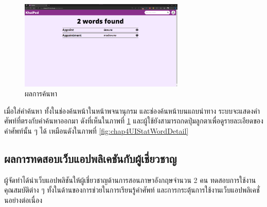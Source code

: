 \documentclass[12pt,oneside,openright,a4paper]{cpe-thai-project}
\begin{document}
\begin{figure}[!h]\centering
	\includegraphics[width=0.7\textwidth, keepaspectratio=true]{image/chap4/UI/dict/result.png}
	\caption{{ผลการค้นหา}}\label{fig:chap4UIDictResult}
\end{figure}
\hspace{1cm}
เมื่อใส่คำค้นหา ทั้งในช่องค้นหน้าในหน้าพจนานุกรม และช่องค้นหน้าบนแถบนำทาง ระบบจะแสดงคำศัพท์ที่ตรงกับคำค้นหาออกมา
ดังที่เห็นในภาพที่ \ref{fig:chap4UIDictResult} และผู้ใช้ยังสามารถกดปุ่มลูกตาเพื่อดูรายละเอียดของคำศัพท์นั้น ๆ ได้
เหมือนดังในภาพที่ \ref{fig:chap4UIStatWordDetail}

\pagebreak
\subsection{ผลการทดสอบเว็บแอปพลิเคชันกับผู้เชี่ยวชาญ}
\hspace{1cm}
ผู้จัดทำได้นำเว็บแอปพลิชันให้ผู้เชี่ยวชาญด้านการสอนภาษาอังกฤษจำนวน 2 คน ทดสอบการใช้งานคุณสมบัติต่าง ๆ
ทั้งในด้านของการช่วยในการเรียนรู้คำศัพท์ และการกระตุ้นการใช้งานเว็บแอปพลิเคชั่นอย่างต่อเนื่อง
\end{document}
